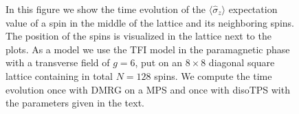 \begin{figure}
\begin{minipage}{1.0\textwidth}
%
	\end{minipage}
	\caption{In this figure we show the time evolution of the $\langle\hat{\sigma}_z\rangle$ expectation value of a spin in the middle of the lattice and its neighboring spins. The position of the spins is visualized in the lattice next to the plots. As a model we use the TFI model in the paramagnetic phase with a transverse field of $g = 6$, put on an $8\times8$ diagonal square lattice containing in total $N = 128$ spins. We compute the time evolution once with DMRG on a MPS and once with disoTPS with the parameters given in the text.}
	\label{fig:disoTPS_time_evolution_g_6}
\end{figure}